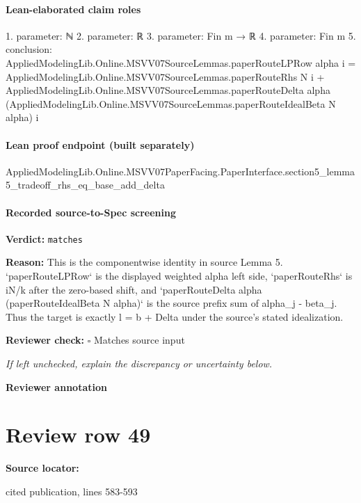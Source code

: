 \documentclass[10pt]{article}
\newcommand{\reviewerbox}{%
  \par\noindent\fbox{\parbox{0.96\linewidth}{\rule{0pt}{0.38in}}}\par
}
\newcommand{\reviewmatch}[1]{%
  \par\noindent\textbf{Reviewer check:} $\square$\; #1\par
  \noindent\emph{If left unchecked, explain the discrepancy or uncertainty below.}\par
}
\begin{document}
\paragraph{Lean-elaborated claim roles}\begin{ReviewVerbatim}
1. parameter: ℕ
2. parameter: ℝ
3. parameter: Fin m → ℝ
4. parameter: Fin m
5. conclusion: AppliedModelingLib.Online.MSVV07SourceLemmas.paperRouteLPRow alpha i =
  AppliedModelingLib.Online.MSVV07SourceLemmas.paperRouteRhs N i +
    AppliedModelingLib.Online.MSVV07SourceLemmas.paperRouteDelta alpha
      (AppliedModelingLib.Online.MSVV07SourceLemmas.paperRouteIdealBeta N alpha) i
\end{ReviewVerbatim}

\paragraph{Lean proof endpoint (built separately)}\begin{ReviewVerbatim}
AppliedModelingLib.Online.MSVV07PaperFacing.PaperInterface.section5_lemma5_tradeoff_rhs_eq_base_add_delta
\end{ReviewVerbatim}

\paragraph{Recorded source-to-Spec screening}
\textbf{Verdict:} \texttt{matches}
\\
{\raggedright
\textbf{Reason:} This is the componentwise identity in source Lemma 5.\allowbreak{} `paperRouteLPRow` is the displayed weighted alpha left side, `paperRouteRhs` is iN/\allowbreak{}k after the zero-\allowbreak{}based shift, and `paperRouteDelta alpha (paperRouteIdealBeta N alpha)` is the source prefix sum of alpha\_\allowbreak{}j -\allowbreak{} beta\_\allowbreak{}j.\allowbreak{} Thus the target is exactly l = b + Delta under the source's stated idealization.\allowbreak{}
\par}
\reviewmatch{Matches source input}
\noindent\textbf{Reviewer annotation}\par
\reviewerbox
\clearpage
\hypertarget{source-claim-2aa161d90efd4a9f}{}
\section*{Review row 49}
\textbf{Source locator:} {\footnotesize\raggedright cited publication, lines 583-\allowbreak{}593\par}
\end{document}
